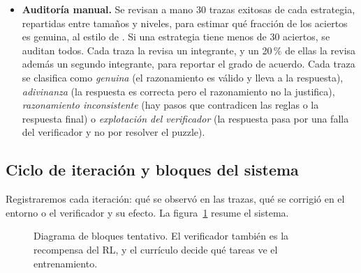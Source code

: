 \documentclass[letterpaper,11pt]{article}
\begin{document}
\begin{itemize}
  \item \textbf{Auditoría manual.} Se revisan a mano 30 trazas exitosas de cada estrategia, repartidas entre tamaños y niveles, para estimar qué fracción de los aciertos es genuina, al estilo de \citet{aleithan2024swebenchplus}. Si una estrategia tiene menos de 30 aciertos, se auditan todos. Cada traza la revisa un integrante, y un 20\,\% de ellas la revisa además un segundo integrante, para reportar el grado de acuerdo. Cada traza se clasifica como \emph{genuina} (el razonamiento es válido y lleva a la respuesta), \emph{adivinanza} (la respuesta es correcta pero el razonamiento no la justifica), \emph{razonamiento inconsistente} (hay pasos que contradicen las reglas o la respuesta final) o \emph{explotación del verificador} (la respuesta pasa por una falla del verificador y no por resolver el puzzle).
\end{itemize}

\subsection{Ciclo de iteración y bloques del sistema}
Registraremos cada iteración: qué se observó en las trazas, qué se corrigió en el entorno o el verificador y su efecto. La figura~\ref{fig:bloques} resume el sistema.

\begin{figure}[htbp]
\centering
{}
\caption{Diagrama de bloques tentativo. El verificador también es la recompensa del RL, y el currículo decide qué tareas ve el entrenamiento.}
\label{fig:bloques}
\end{figure}
\end{document}
